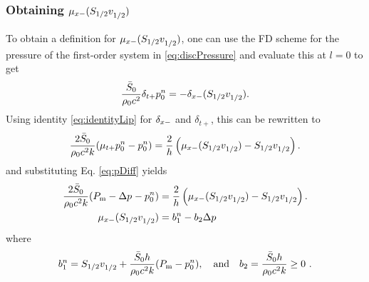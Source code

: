 \subsubsection{Obtaining $\mu_{x-}(S_{1/2}v_{1/2}^{})$}
To obtain a definition for $\mu_{x-}(S_{1/2}v_{1/2}^{})$, one can use the FD scheme for the pressure of the first-order system in \eqref{eq:discPressure} and evaluate this at $l = 0$ to get
\begin{equation}
    \frac{\bar S_0}{\rho_0 c^2}\delta_{t+}p_0^n = -\delta_{x-}(S_{1/2}v_{1/2}^{}).
\end{equation}
Using identity \eqref{eq:identityLip} for $\delta_{x-}$ and $\delta_{t+}$, this can be rewritten to
\begin{equation}
    \frac{2\bar S_0}{\rho_0 c^2k}(\mu_{t+}p_0^n-p_0^n) = \frac{2}{h} \left(\mu_{x-}(S_{1/2}v_{1/2}^{})-S_{1/2}v_{1/2}^{}\right).
\end{equation}
and substituting Eq. \eqref{eq:pDiff} yields
\begin{align}
    \frac{2\bar S_0}{\rho_0 c^2k}(P_\text{m} - \Delta p^{}-p_0^n) &= \frac{2}{h} \left(\mu_{x-}(S_{1/2}v_{1/2}^{})-S_{1/2}v_{1/2}^{}\right).\nonumber\\
    \mu_{x-}(S_{1/2}v_{1/2}^{}) &= b_1^n - b_2\Delta p^{}\label{eq:bEquation}
\end{align}
where
\begin{equation}\label{eq:bCoeffs}
    b_1^n = S_{1/2}v_{1/2}^{} + \frac{\bar S_0h}{\rho_0 c^2k} (P_\text{m} - p_0^n), \quad \text{and} \quad b_2 = \frac{\bar S_0h}{\rho_0 c^2k} \geq 0\ .
\end{equation}
